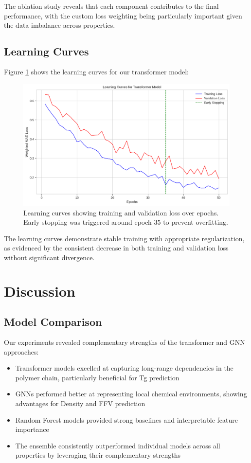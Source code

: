 \documentclass[10pt,twocolumn,letterpaper]{article}
\begin{document}
The ablation study reveals that each component contributes to the final performance, with the custom loss weighting being particularly important given the data imbalance across properties.

\subsection{Learning Curves}

Figure \ref{fig:learning_curves} shows the learning curves for our transformer model:

\begin{figure}[h]
\centering
\includegraphics[width=0.9\linewidth]{figures/learning_curves.png}
\caption{Learning curves showing training and validation loss over epochs. Early stopping was triggered around epoch 35 to prevent overfitting.}
\label{fig:learning_curves}
\end{figure}

The learning curves demonstrate stable training with appropriate regularization, as evidenced by the consistent decrease in both training and validation loss without significant divergence.

\section{Discussion}

\subsection{Model Comparison}

Our experiments revealed complementary strengths of the transformer and GNN approaches:
\begin{itemize}
    \item Transformer models excelled at capturing long-range dependencies in the polymer chain, particularly beneficial for Tg prediction
    \item GNNs performed better at representing local chemical environments, showing advantages for Density and FFV prediction
    \item Random Forest models provided strong baselines and interpretable feature importance
    \item The ensemble consistently outperformed individual models across all properties by leveraging their complementary strengths
\end{itemize}
\end{document}
